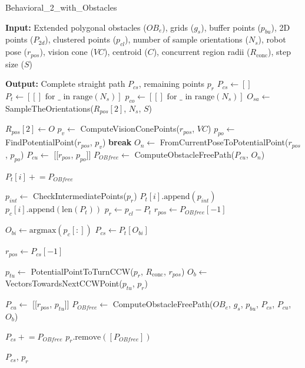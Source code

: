     









\begin{algorithm}[H]
    \caption{Behavioral\_2\_with\_Obstacles}
    \label{alg:behavioral_algorithm_2_obs}
    \begin{algorithmic}[1]

    \Statex \textbf{Input:} Extended polygonal obstacles ($OB_e$), grids ($g_s$), buffer points ($p_{bu}$), 2D points ($P_{2d}$), clustered points ($p_{cl}$), number of sample orientations ($N_s$), robot pose ($r_{pos}$), vision cone ($VC$), centroid ($C$), concurrent region radii ($R_{\text{conc}}$), step size ($S$)

    \Statex \textbf{Output:} Complete straight path $P_{cs}$, remaining points $p_r$
    \newline
    \State $P_{cs} \leftarrow []$
    \State $P_t \leftarrow [[] \text{ for } \_ \text{ in range}(N_s)]$
    \State $p_{co} \leftarrow [[] \text{ for } \_ \text{ in range}(N_s)]$
    \State $O_{sa} \leftarrow$ SampleTheOrientations($R_{pos}[2]$, $N_s$, $S$)
    
        \State $R_{pos}[2] \leftarrow O$
            \State $p_v \leftarrow$ ComputeVisionConePoints($r_{pos}$, $VC$)
            \State $p_{po} \leftarrow$ FindPotentialPoint($r_{pos}$, $p_v$)
                \State \textbf{break}
            \EndIf
            \State $O_n \leftarrow$ FromCurrentPoseToPotentialPoint($r_{pos}$, $p_{po}$)
            \State $P_{cu} \leftarrow$ [[$r_{pos}$, $p_{po}$]]
            \State $P_{OB free} \leftarrow$ ComputeObstacleFreePath($P_{cu}$, $O_n$)


            \State $P_t[i] \mathrel{+}= P_{OB free}$
            
            \State $p_{int} \leftarrow$ CheckIntermediatePoints($p_r$)
            \State $P_t[i].\text{append}(p_{int})$
            \State $p_c[i].\text{append}(\text{len}(P_t))$
            \State $p_r \leftarrow p_{cl} - P_t$
            \State $r_{pos} \leftarrow P_{OB free}[-1]$
        \EndWhile
    \EndFor
    
    \State $O_{bi} \leftarrow \text{argmax}(p_c[:])$
    \State $P_{cs} \leftarrow P_t[O_{bi}]$
    
    \State $r_{pos} \leftarrow P_{cs}[-1]$

    \State $p_{tu} \leftarrow$ PotentialPointToTurnCCW($p_r$, $R_{\text{conc}}$, $r_{pos}$)
    \State $O_b \leftarrow$ VectorsTowardsNextCCWPoint($p_{tu}$, $p_r$)


    \State $P_{cu} \leftarrow$ [[$r_{pos}$, $p_{tu}$]]
    \State $P_{OB free} \leftarrow$ ComputeObstacleFreePath($OB_e$, $g_s$, $p_{bu}$, $P_{cs}$, $P_{cu}$, $O_b$)

    \State $P_{cs} \mathrel{+}= P_{OB free}$
    \State $p_r.\text{remove}([P_{OB free}])$ 
    
    \State \Return $P_{cs}$, $p_r$
    \end{algorithmic}
    \end{algorithm}

